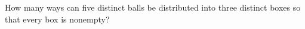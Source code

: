 How many ways can five distinct balls be distributed into three distinct boxes so that every box is nonempty?

